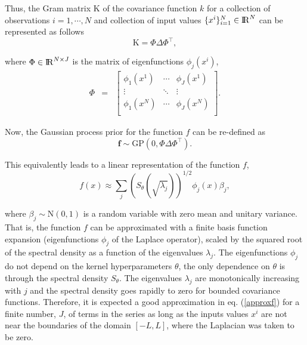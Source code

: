 \documentclass[]{interact}
\theoremstyle{plain}%
\theoremstyle{definition}
\theoremstyle{remark}
\begin{document}
Thus, the Gram matrix $\text{K}$ of the covariance function $k$ for a collection of observations $i=1,\cdots,N$ and collection of input values $\{x^i\}_{i=1}^{N} \in {\rm I\!R}^{N}$ can be represented as follows
%
\begin{equation}
\text{K}= \Phi \Delta \Phi^\intercal, \nonumber
\end{equation}

\noindent where $\Phi \in {\rm I\!R}^{N\times J}$ is the matrix of eigenfunctions $\phi_j(x^i)$,
%
\begin{eqnarray}
\Phi &=&  \left[ {\begin{array}{ccc}
   \phi_1(x^1) & \cdots & \phi_J(x^1)  \\
    \vdots &\ddots & \vdots  \nonumber \\ 
    \phi_1(x^N) & \cdots & \phi_J(x^N) \\
  \end{array} } \right].
\end{eqnarray}
 
\noindent Now, the Gaussian process prior for the function $f$ can be re-defined as
%
\begin{equation}
\mathbf{f} \sim \text{GP}(0,\Phi \Delta \Phi^\intercal). \nonumber
\end{equation}

\noindent This equivalently leads to a linear representation of the function $f$,
%
\begin{equation}\label{approxf}
f(x) \approx \sum_{j} \left( S_{\theta}(\sqrt{\lambda_j})\right)^{1/2} \phi_j(x) \beta_j, \nonumber
\end{equation}

\noindent where $\beta_j \sim \text{N}(0,1)$ is a random variable with zero mean and unitary variance. That is, the function $f$ can be approximated with a finite basis function expansion (eigenfunctions $\phi_j$ of the Laplace operator), scaled by the squared root of the spectral density as a function of the eigenvalues $\lambda_j$. The eigenfunctions $\phi_j$ do not depend on the kernel hyperparameters $\theta$, the only dependence on $\theta$ is through the spectral density $S_{\theta}$. The eigenvalues $\lambda_j$ are monotonically increasing with $j$ and the spectral density goes rapidly to zero for bounded covariance functions. Therefore, it is expected a good approximation in eq. (\ref{approxf}) for a finite number, $J$, of terms in the series as long as the inputs values $x^i$ are not near the boundaries of the domain $[-L,L]$, where the Laplacian was taken to be zero.
\end{document}
